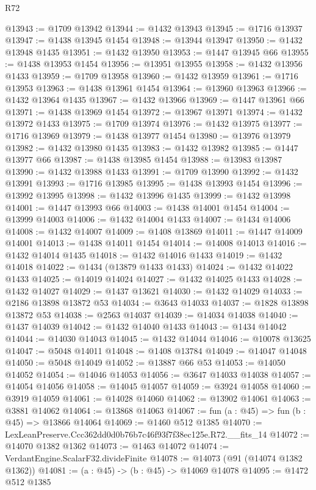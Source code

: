 \begin{lexlean}{R72}
\begin{coremodule}
@13943 := @1709 @13942
@13944 := @1432 @13943
@13945 := @1716 @13937
@13947 := @1438 @13945 @1454
@13948 := @13944 @13947
@13950 := @1432 @13948 @1435
@13951 := @1432 @13950
@13953 := @1447 @13945 @66
@13955 := @1438 @13953 @1454
@13956 := @13951 @13955
@13958 := @1432 @13956 @1433
@13959 := @1709 @13958
@13960 := @1432 @13959
@13961 := @1716 @13953
@13963 := @1438 @13961 @1454
@13964 := @13960 @13963
@13966 := @1432 @13964 @1435
@13967 := @1432 @13966
@13969 := @1447 @13961 @66
@13971 := @1438 @13969 @1454
@13972 := @13967 @13971
@13974 := @1432 @13972 @1433
@13975 := @1709 @13974
@13976 := @1432 @13975
@13977 := @1716 @13969
@13979 := @1438 @13977 @1454
@13980 := @13976 @13979
@13982 := @1432 @13980 @1435
@13983 := @1432 @13982
@13985 := @1447 @13977 @66
@13987 := @1438 @13985 @1454
@13988 := @13983 @13987
@13990 := @1432 @13988 @1433
@13991 := @1709 @13990
@13992 := @1432 @13991
@13993 := @1716 @13985
@13995 := @1438 @13993 @1454
@13996 := @13992 @13995
@13998 := @1432 @13996 @1435
@13999 := @1432 @13998
@14001 := @1447 @13993 @66
@14003 := @1438 @14001 @1454
@14004 := @13999 @14003
@14006 := @1432 @14004 @1433
@14007 := @1434 @14006
@14008 := @1432 @14007
@14009 := @1408 @13869
@14011 := @1447 @14009 @14001
@14013 := @1438 @14011 @1454
@14014 := @14008 @14013
@14016 := @1432 @14014 @1435
@14018 := @1432 @14016 @1433
@14019 := @1432 @14018
@14022 := @1434 (@13879 @1433 @1433)
@14024 := @1432 @14022 @1433
@14025 := @14019 @14024
@14027 := @1432 @14025 @1433
@14028 := @1432 @14027
@14029 := @1437 @13621
@14030 := @1432 @14029
@14033 := @2186 @13898 @13872 @53
@14034 := @3643 @14033
@14037 := @1828 @13898 @13872 @53
@14038 := @2563 @14037
@14039 := @14034 @14038
@14040 := @1437 @14039
@14042 := @1432 @14040 @1433
@14043 := @1434 @14042
@14044 := @14030 @14043
@14045 := @1432 @14044
@14046 := @10078 @13625
@14047 := @5048 @14011
@14048 := @1408 @13784
@14049 := @14047 @14048
@14050 := @5048 @14049
@14052 := @13887 @66 @53
@14053 := @14050 @14052
@14054 := @14046 @14053
@14056 := @3647 @14033 @14038
@14057 := @14054 @14056
@14058 := @14045 @14057
@14059 := @3924 @14058
@14060 := @3919 @14059
@14061 := @14028 @14060
@14062 := @13902 @14061
@14063 := @3881 @14062
@14064 := @13868 @14063
@14067 := fun (a : @45) => fun (b : @45) => @13866 @14064
@14069 := @1460 @512 @1385
@14070 := LexLeanPreserve.Ccc362dd0d0b76b7c46f93f7f38ec125e.R72.__fits_14
@14072 := @14070 @1382 @1362
@14073 := @1463 @14072
@14074 := VerdantEngine.ScalarF32.divideFinite
@14078 := @14073 (@91 (@14074 @1382 @1362))
@14081 := (a : @45) -> (b : @45) -> @14069 @14078
@14095 := @1472
    @512
    @1385

\end{coremodule}
\end{lexlean}
